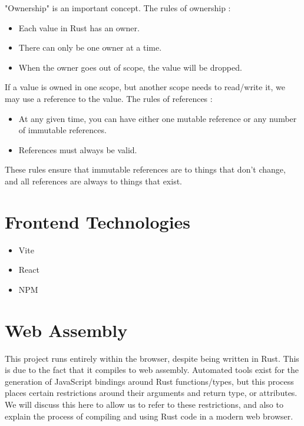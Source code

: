 "Ownership" is an important concept. The rules of ownership \cite{rust_book}:
\begin{itemize}
    \item Each value in Rust has an owner.
    \item There can only be one owner at a time.
    \item When the owner goes out of scope, the value will be dropped.
\end{itemize}   

If a value is owned in one scope, but another scope needs to read/write it, we may use a reference to the value. The rules of references \cite{rust_book}:
\begin{itemize}
    \item At any given time, you can have either one mutable reference or any number of immutable references. 
    \item References must always be valid.
\end{itemize}

These rules ensure that immutable references are to things that don't change, and all references are always to things that exist.

\section{Frontend Technologies}
\label{bg:frontend}
\begin{itemize}
    \item Vite
    \item React
    \item NPM
\end{itemize}

\section{Web Assembly} \label{bg:wasm}
This project runs entirely within the browser, despite being written in Rust. This is due to the fact that it compiles to web assembly. Automated tools exist for the generation of JavaScript bindings around Rust functions/types, but this process places certain restrictions around their arguments and return type, or attributes. We will discuss this here to allow us to refer to these restrictions, and also to explain the process of compiling and using Rust code in a modern web browser. 

